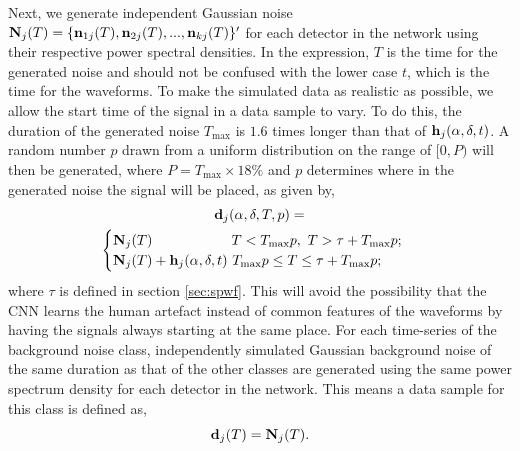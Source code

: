\documentclass[aps,twocolumn,showpacs,groupedaddress, nofootinbib]{revtex4}  %
\begin{document}
%
Next, we generate independent Gaussian noise $\bold{N}_j(T) =
\{\bold{n}_{1j}(T), \bold{n}_{2j}(T), ..., \bold{n}_{kj}(T)\}'$ for each
detector in the network using their respective power spectral
densities. In the expression, $T$ is the time for the generated noise and should not be confused with the lower case $t$, 
which is the time for the waveforms.
To make the simulated data as realistic as possible, 
we allow the start time of the signal in a data sample to vary.
To do this,  the duration of the generated noise $T_{\text{max}}$ is $1.6$ times longer than
that of $\bold{h}_j(\alpha, \delta, t)$. A random number $p$ drawn from 
a uniform distribution on the range of $[0, P)$ 
will then be generated, where
$P = T_{\text{max}}\times 18\% $  and $p$ 
determines where in
the generated noise the signal will be placed, as given by,
%
\begin{multline}
\bold{d}_j(\alpha, \delta, T, p)=
\\
\begin{cases}
\bold{N}_j(T)~~~~~~~~~~~~~~~~~T < T_{\text{max}} p,~T > \tau + T_{\text{max}} p; \\
\bold{N}_j(T) + \bold{h}_j(\alpha, \delta, t)~ T_{\text{max}} p \leq T \leq \tau + T_{\text{max}} p; \\
\end{cases}
\end{multline}
%
where $\tau$ is defined in section \ref{sec:spwf}. 
This will avoid the possibility that the \ac{CNN}
learns the human artefact instead of common features of the waveforms by having
the signals always starting at the same place.
For each time-series of the background noise class, independently simulated Gaussian
background noise  of the
same duration as that of the other classes are generated using the same power spectrum density 
for each detector in the network. This means a data sample for this class is defined as,
%
\begin{equation}\label{eq:noise}
 \bold{d}_j(T) = \bold{N}_j(T).
\end{equation}
\end{document}
